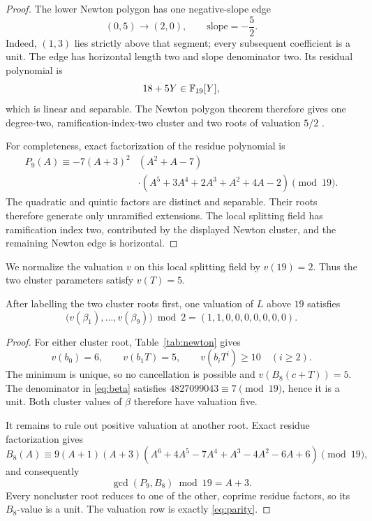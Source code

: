\begin{proof}
The lower Newton polygon has one negative-slope edge
\[
 (0,5)\longrightarrow(2,0),\qquad \text{slope}=-\frac52.
\]
Indeed, \((1,3)\) lies strictly above that segment; every subsequent
coefficient is a unit.  The edge has horizontal length two and slope
denominator two.  Its residual polynomial is
\[
 18+5Y\in\mathbb{F}_{19}[Y],
\]
which is linear and separable.  The Newton polygon theorem therefore gives
one degree-two, ramification-index-two cluster and two roots of valuation
\(5/2\) \citep{serre1979localfields}.

For completeness, exact factorization of the residue polynomial is
\begin{align*}
 P_9(A)\equiv -7(A+3)^2
 &(A^2+A-7)\\
 &\cdot(A^5+3A^4+2A^3+A^2+4A-2)\pmod {19}.
\end{align*}
The quadratic and quintic factors are distinct and separable.  Their roots
therefore generate only unramified extensions.  The local splitting field
has ramification index two, contributed by the displayed Newton cluster,
and the remaining Newton edge is horizontal.
\end{proof}

We normalize the valuation \(v\) on this local splitting field by
\(v(19)=2\).  Thus the two cluster parameters satisfy \(v(T)=5\).

\begin{proposition}\label{prop:odd-hill}
After labelling the two cluster roots first, one valuation of \(L\) above
\(19\) satisfies
\begin{equation}
 \bigl(v(\beta_1),\ldots,v(\beta_9)\bigr)\bmod2
   =(1,1,0,0,0,0,0,0,0).                                  \label{eq:parity}
\end{equation}
\end{proposition}

\begin{proof}
For either cluster root, Table~\ref{tab:newton} gives
\[
 v(b_0)=6,\qquad v(b_1T)=5,\qquad v(b_iT^i)\ge10\quad(i\ge2).
\]
The minimum is unique, so no cancellation is possible and
\(v(B_8(c+T))=5\).  The denominator in \eqref{eq:beta} satisfies
\(4827099043\equiv7\pmod {19}\), hence it is a unit.  Both cluster values
of \(\beta\) therefore have valuation five.

It remains to rule out positive valuation at another root.  Exact residue
factorization gives
\[
 B_8(A)\equiv9(A+1)(A+3)
 (A^6+4A^5-7A^4+A^3-4A^2-6A+6)\pmod {19},
\]
and consequently
\begin{equation}
 \gcd(P_9,B_8)\bmod19=A+3.                                  \label{eq:gcd19}
\end{equation}
Every noncluster root reduces to one of the other, coprime residue factors,
so its \(B_8\)-value is a unit.  The valuation row is exactly
\eqref{eq:parity}.
\end{proof}

